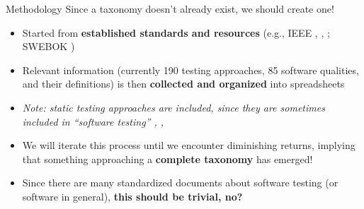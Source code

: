 \documentclass[22pt]{beamer}
\begin{document}
\begin{frame}[fragile]
\begin{textblock}{7.25}
        \begin{block}{\fontsize{37}{20}\selectfont Methodology}
            Since a taxonomy doesn't already exist, we should create one!
            \begin{itemize}
                \item Started from \textbf{established standards and resources}
                      (e.g., IEEE \cite{IEEE2022}, \cite{IEEE2017}, \cite{IEEE2013};
                      SWEBOK \cite{SWEBOK2024})
                \item Relevant information (currently 190 testing approaches,
                      85 software qualities, and their definitions) is then
                      \textbf{collected and organized} into spreadsheets
                \item \emph{Note: static testing approaches are included, since
                          they are sometimes included in ``software testing''
                          \cite[p.~17]{IEEE2022}, \cite[p.~440]{IEEE2017},
                          \cite[p.~5-2]{SWEBOK2024}}
                \item We will iterate this process until we encounter
                      diminishing returns, implying that something approaching
                      a \textbf{complete taxonomy} has emerged!
                \item Since there are many standardized documents about
                      software testing (or software in general),
                      \textbf{this should be trivial, no?}
            \end{itemize}
            \vspace{5mm}
        \end{block}


\end{textblock}
\end{frame}
\end{document}
